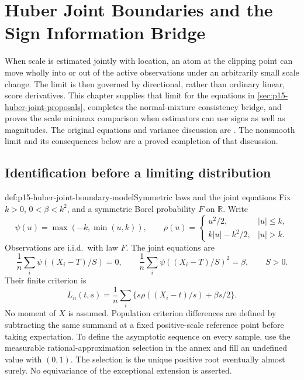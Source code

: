 \chapter{Huber Joint Boundaries and the Sign Information Bridge}
\label{sec:p15-huber-joint-endpoints}

When scale is estimated jointly with location, an atom at the clipping
point can move wholly into or out of the active observations under
an arbitrarily small scale change. The limit is then governed by
directional, rather than ordinary linear, score derivatives.
This chapter supplies that limit for the equations in
\cref{sec:p15-huber-joint-proposals}, completes the normal-mixture
consistency bridge, and proves the scale minimax comparison when
estimators can use signs as well as magnitudes.
The original equations and variance discussion are
\cite[Secs.~10--11, pp.~94--100]{Huber1964RobustLocation}.
The nonsmooth limit and its consequences below are a proved
completion of that discussion.

\section{Identification before a limiting distribution}
\label{sec:p15-huber-joint-identification}

\begin{hbdefinition}{def:p15-huber-joint-boundary-model}{Symmetric laws and the joint equations}
Fix \(k>0\), \(0<\beta<k^2\), and a symmetric Borel probability
\(F\) on \(\mathbb R\). Write
\[
 \psi(u)=\max(-k,\min(u,k)),\qquad
 \rho(u)=
 \begin{cases}u^2/2,&|u|\leq k,\\ k|u|-k^2/2,&|u|>k.\end{cases}
\]
Observations are i.i.d.\ with law \(F\). The joint equations are
\[
 \frac1n\sum_i\psi((X_i-T)/S)=0,\qquad
 \frac1n\sum_i\psi((X_i-T)/S)^2=\beta,\qquad S>0.
\]
Their finite criterion is
\[
 L_n(t,s)=\frac1n\sum_i
       \{s\rho((X_i-t)/s)+\beta s/2\}.
\]
No moment of \(X\) is assumed. Population criterion differences
are defined by subtracting the same summand at a fixed positive-scale
reference point before taking expectation.
To define the asymptotic sequence on every sample, use the measurable
rational-approximation selection in the annex and fill an undefined
value with \((0,1)\). The selection is the unique positive root
eventually almost surely. No equivariance of the exceptional
extension is asserted.
\end{hbdefinition}

